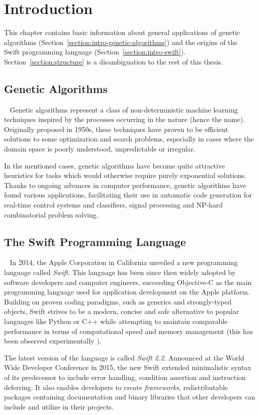 \chapter{Introduction}
This chapter contains basic information about general applications of genetic algorithms (Section~\ref{section:intro-genetic-algorithms}) and the origins of the Swift programming language (Section~\ref{section:intro-swift}). Section~\ref{section:structure} is a disambiguation to the rest of this thesis.

\section{Genetic Algorithms}~\label{section:intro-genetic-algorithms}
Genetic algorithms represent a class of non-deterministic machine learning techniques inspired by the processes occurring in the nature (hence the name). Originally proposed in 1950s, these techniques have proven to be efficient solutions to some optimization and search problems, especially in cases where the domain space is poorly understood, unpredictable or irregular.

In the mentioned cases, genetic algorithms have become quite attractive heuristics for tasks which would otherwise require purely exponential solutions. Thanks to ongoing advances in computer performance, genetic algorithms have found various applications, facilitating their use in automatic code generation for real-time control systems and classifiers, signal processing and NP-hard combinatorial problem solving.

\section{The Swift Programming Language}~\label{section:intro-swift}
In 2014, the Apple Corporation in California unveiled a new programming language called \textit{Swift}. \cite{SwiftReference} This language has been since then widely adopted by software developers and computer engineers, succeeding Objective-C as the main programming language used for application development on the Apple platform. Building on proven coding paradigms, such as generics and strongly-typed objects, Swift strives to be a modern, concise and safe alternative to popular languages like Python or C++ while attempting to maintain comparable performance in terms of computational speed and memory management (this has been observed experimentally \cite{PrimateLabsBenchmark}).

The latest version of the language is called \textit{Swift 2.2}. Announced at the World Wide Developer Conference in 2015, the new Swift extended minimalistic syntax of its predecessor to include error handling, condition assertion and instruction deferring. It also enables developers to create \textit{frameworks}, redistributable packages containing documentation and binary libraries that other developers can include and utilize in their projects.

